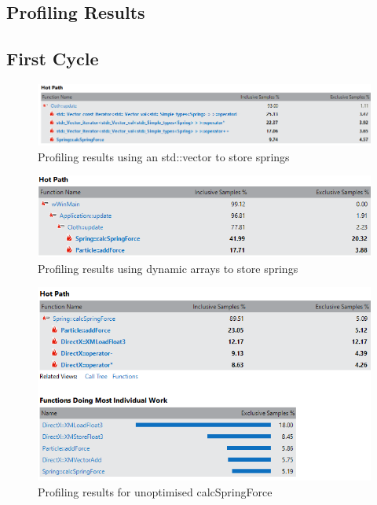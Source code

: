 \begin{landscape}
\chapter{Profiling Results}

\section{First Cycle}
  \begin{figure}[!htb]
    \begin{center}
      \includegraphics[scale=1.0]{Figures/vector_profiling_before}
    \end{center}
    \caption{Profiling results using an std::vector to store springs}
    \label{fig:profiling1}
  \end{figure}
  
    \begin{figure}
    \begin{center}
      \includegraphics[scale=1.0]{Figures/vector_profiling_after}
    \end{center}
    \caption{Profiling results using dynamic arrays to store springs}
    \label{fig:profiling2}
  \end{figure}
  
    \begin{figure}[!htb]
    \begin{center}
      \includegraphics[scale=1.0]{Figures/calcspringforce_profiling_before}
    \end{center}
    \caption{Profiling results for unoptimised calcSpringForce}
    \label{fig:profiling3}
  \end{figure}
  

\end{landscape}
